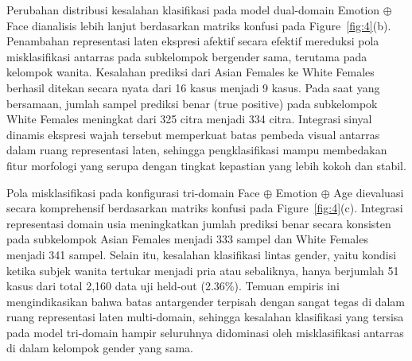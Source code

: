 Perubahan distribusi kesalahan klasifikasi pada model dual-domain Emotion $\oplus$ Face dianalisis lebih lanjut berdasarkan matriks konfusi pada Figure~\ref{fig:4}(b). Penambahan representasi laten ekspresi afektif secara efektif mereduksi pola misklasifikasi antarras pada subkelompok bergender sama, terutama pada kelompok wanita. Kesalahan prediksi dari Asian Females ke White Females berhasil ditekan secara nyata dari 16 kasus menjadi 9 kasus. Pada saat yang bersamaan, jumlah sampel prediksi benar (true positive) pada subkelompok White Females meningkat dari 325 citra menjadi 334 citra. Integrasi sinyal dinamis ekspresi wajah tersebut memperkuat batas pembeda visual antarras dalam ruang representasi laten, sehingga pengklasifikasi mampu membedakan fitur morfologi yang serupa dengan tingkat kepastian yang lebih kokoh dan stabil.

Pola misklasifikasi pada konfigurasi tri-domain Face $\oplus$ Emotion $\oplus$ Age dievaluasi secara komprehensif berdasarkan matriks konfusi pada Figure~\ref{fig:4}(c). Integrasi representasi domain usia meningkatkan jumlah prediksi benar secara konsisten pada subkelompok Asian Females menjadi 333 sampel dan White Females menjadi 341 sampel. Selain itu, kesalahan klasifikasi lintas gender, yaitu kondisi ketika subjek wanita tertukar menjadi pria atau sebaliknya, hanya berjumlah 51 kasus dari total 2,160 data uji held-out (2.36\%). Temuan empiris ini mengindikasikan bahwa batas antargender terpisah dengan sangat tegas di dalam ruang representasi laten multi-domain, sehingga kesalahan klasifikasi yang tersisa pada model tri-domain hampir seluruhnya didominasi oleh misklasifikasi antarras di dalam kelompok gender yang sama.
